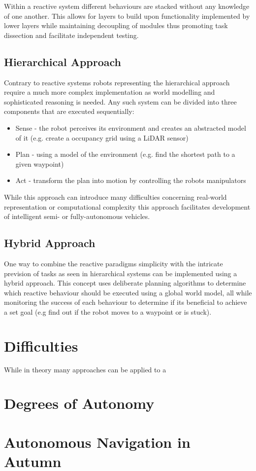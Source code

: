 Within a reactive system different behaviours are stacked without any knowledge of one another. This allows for layers to build upon functionality implemented by lower layers while maintaining decoupling of modules thus promoting task dissection and facilitate independent testing. 

\subsection{Hierarchical Approach}
Contrary to reactive systems robots representing the hierarchical approach require a much more complex implementation as world modelling and sophisticated reasoning is needed. 
Any such system can be divided into three components that are executed sequentially:
\begin{itemize}
	\item Sense - the robot perceives its environment and creates an abstracted model of it (e.g. create a occupancy grid using a LiDAR sensor)
	\item Plan - using a model of the environment (e.g. find the shortest path to a given waypoint)
	\item Act - transform the plan into motion by controlling the robots manipulators
\end{itemize}

While this approach can introduce many difficulties concerning real-world representation or computational complexity this approach facilitates development of intelligent semi- or fully-autonomous vehicles. 

\subsection{Hybrid Approach}
One way to combine the reactive paradigms simplicity with the intricate prevision of tasks as seen in hierarchical systems can be implemented using a hybrid approach. 
This concept uses deliberate planning algorithms to determine which reactive behaviour should be executed using a global world model, all while monitoring the success of each behaviour to determine if its beneficial to achieve a set goal (e.g find out if the robot moves to a waypoint or is stuck).

\section{Difficulties}
While in theory many approaches can be applied to a 



\section{Degrees of Autonomy}

\section{Autonomous Navigation in Autumn}


\filbreak
